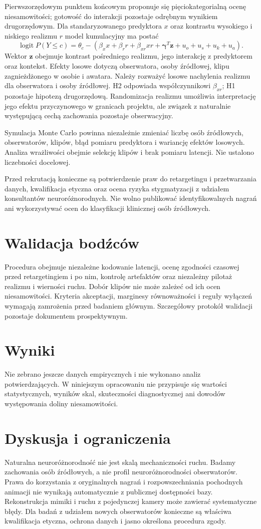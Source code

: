 \documentclass[11pt,a4paper]{article}
\begin{document}
Pierwszorzędowym punktem końcowym proponuje się pięciokategorialną ocenę niesamowitości; gotowość do interakcji pozostaje odrębnym wynikiem drugorzędowym. Dla standaryzowanego predyktora $x$ oraz kontrastu wysokiego i niskiego realizmu $r$ model kumulacyjny ma postać
\[
\operatorname{logit}P(Y\leq c)=\theta_c-(\beta_x x+\beta_r r+\beta_{xr}xr+\boldsymbol{\gamma}^{T}\mathbf{z}+u_o+u_s+u_k+u_a).
\]
Wektor $\mathbf{z}$ obejmuje kontrast pośredniego realizmu, jego interakcję z predyktorem oraz kontekst. Efekty losowe dotyczą obserwatora, osoby źródłowej, klipu zagnieżdżonego w osobie i awatara. Należy rozważyć losowe nachylenia realizmu dla obserwatora i osoby źródłowej. H2 odpowiada współczynnikowi $\beta_{xr}$; H1 pozostaje hipotezą drugorzędową. Randomizacja realizmu umożliwia interpretację jego efektu przyczynowego w granicach projektu, ale związek z naturalnie występującą cechą zachowania pozostaje obserwacyjny.

Symulacja Monte Carlo powinna niezależnie zmieniać liczbę osób źródłowych, obserwatorów, klipów, błąd pomiaru predyktora i wariancję efektów losowych. Analiza wrażliwości obejmie selekcję klipów i brak pomiaru latencji. Nie ustalono liczebności docelowej.

Przed rekrutacją konieczne są potwierdzenie praw do retargetingu i przetwarzania danych, kwalifikacja etyczna oraz ocena ryzyka stygmatyzacji z udziałem konsultantów neuroróżnorodnych. Nie wolno publikować identyfikowalnych nagrań ani wykorzystywać ocen do klasyfikacji klinicznej osób źródłowych.
\section{Walidacja bodźców}
Procedura obejmuje niezależne kodowanie latencji, ocenę zgodności czasowej przed retargetingiem i po nim, kontrolę artefaktów oraz niezależny pilotaż realizmu i wierności ruchu. Dobór klipów nie może zależeć od ich ocen niesamowitości. Kryteria akceptacji, marginesy równoważności i reguły wyłączeń wymagają zamrożenia przed badaniem głównym. Szczegółowy protokół walidacji pozostaje dokumentem prospektywnym.
\section{Wyniki}
Nie zebrano jeszcze danych empirycznych i nie wykonano analiz potwierdzających. W niniejszym opracowaniu nie przypisuje się wartości statystycznych, wyników skal, skuteczności diagnostycznej ani dowodów występowania doliny niesamowitości.
\section{Dyskusja i ograniczenia}
Naturalna neuroróżnorodność nie jest skalą mechaniczności ruchu. Badamy zachowania osób źródłowych, a nie profil neuroróżnorodności obserwatorów. Prawa do korzystania z oryginalnych nagrań i rozpowszechniania pochodnych animacji nie wynikają automatycznie z publicznej dostępności bazy. Rekonstrukcja mimiki i ruchu z pojedynczej kamery może zawierać systematyczne błędy. Dla badań z udziałem nowych obserwatorów konieczne są właściwa kwalifikacja etyczna, ochrona danych i jasno określona procedura zgody.
\end{document}
